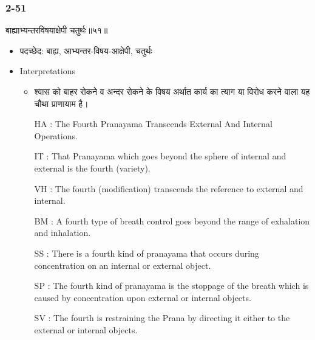\begin{frame}[fragile]\frametitle{2-51}
\begin{sanskrit}
बाह्याभ्यन्तरविषयाक्षेपी चतुर्थः॥५१॥
\end{sanskrit}

	\begin{itemize}
	\item पदच्छेद: बाह्य, आभ्यन्तर-विषय-आक्षेपी, चतुर्थः
	\item Interpretations
		\begin{itemize}
		\item श्वास को बाहर रोकने व अन्दर रोकने के विषय अर्थात कार्य का त्याग या विरोध करने वाला यह चौथा प्राणायाम है।
		\item [HA]: The Fourth Pranayama Transcends External And Internal Operations.
		\item [IT]: That Pranayama which goes beyond the sphere of internal and external is the fourth (variety).
		\item [VH]: The fourth (modification) transcends the reference to external and internal.
		\item [BM]: A fourth type of breath control goes beyond the range of exhalation and inhalation.
		\item [SS]: There is a fourth kind of pranayama that occurs during concentration on an internal or external object.
		\item [SP]: The fourth kind of pranayama is the stoppage of the breath which is caused by concentration upon external or internal objects.
		\item [SV]: The fourth is restraining the Prana by directing it either to the external or internal objects. 
		\end{itemize}
	\end{itemize}	
\end{frame}

